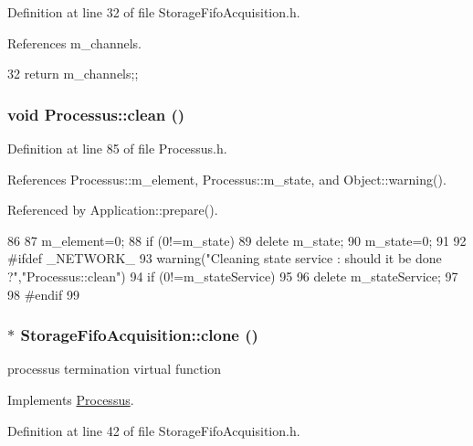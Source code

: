 Definition at line 32 of file StorageFifoAcquisition.h.

References m\_\-channels.


\begin{DoxyCode}
32 {return m_channels;};
\end{DoxyCode}
\hypertarget{classProcessus_aaeb17673b98d2b39f3aa780e335e0968}{
\subsubsection[{clean}]{\setlength{\rightskip}{0pt plus 5cm}void Processus::clean ()}}
\label{classProcessus_aaeb17673b98d2b39f3aa780e335e0968}


Definition at line 85 of file Processus.h.

References Processus::m\_\-element, Processus::m\_\-state, and Object::warning().

Referenced by Application::prepare().


\begin{DoxyCode}
86   {
87     m_element=0;
88     if (0!=m_state) {
89       delete m_state;
90       m_state=0;
91     }
92 #ifdef _NETWORK_
93     warning("Cleaning state service : should it be done ?","Processus::clean")
94       if (0!=m_stateService)
95       {
96         delete m_stateService;
97       }
98 #endif
99   }
\end{DoxyCode}
\hypertarget{classStorageFifoAcquisition_aab797010fd3efe7ef2c4a6e6ba4e87c2}{
\subsubsection[{clone}]{$\ast$ StorageFifoAcquisition::clone ()}}
\label{classStorageFifoAcquisition_aab797010fd3efe7ef2c4a6e6ba4e87c2}
processus termination virtual function 

Implements \hyperlink{classProcessus_aca8856f6d6d7b7e1fe941f298dcbb502}{Processus}.

Definition at line 42 of file StorageFifoAcquisition.h.

